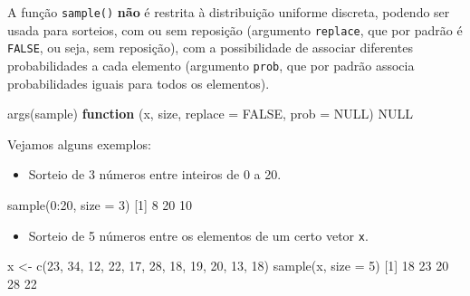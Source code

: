 \documentclass[
  10pt,
  a4paper]{book}
\newenvironment{Shaded}{\begin{snugshade}}{\end{snugshade}}
\newcommand{\AttributeTok}[1]{\textcolor[rgb]{0.77,0.63,0.00}{#1}}
\newcommand{\ConstantTok}[1]{\textcolor[rgb]{0.00,0.00,0.00}{#1}}
\newcommand{\ControlFlowTok}[1]{\textcolor[rgb]{0.13,0.29,0.53}{\textbf{#1}}}
\newcommand{\DecValTok}[1]{\textcolor[rgb]{0.00,0.00,0.81}{#1}}
\newcommand{\FunctionTok}[1]{\textcolor[rgb]{0.00,0.00,0.00}{#1}}
\newcommand{\NormalTok}[1]{#1}
\newcommand{\OtherTok}[1]{\textcolor[rgb]{0.56,0.35,0.01}{#1}}
\newcommand{\SpecialCharTok}[1]{\textcolor[rgb]{0.00,0.00,0.00}{#1}}
\providecommand{\tightlist}{%
  \setlength{\itemsep}{0pt}\setlength{\parskip}{0pt}}
\begin{document}
A função \texttt{sample()} \textbf{não} é restrita à distribuição uniforme discreta,
podendo ser usada para sorteios, com ou sem reposição (argumento
\texttt{replace}, que por padrão é \texttt{FALSE}, ou seja, sem reposição), com a
possibilidade de associar diferentes probabilidades a cada elemento
(argumento \texttt{prob}, que por padrão associa probabilidades iguais para
todos os elementos).

\begin{Shaded}
\begin{Highlighting}[]
\FunctionTok{args}\NormalTok{(sample)}
\ControlFlowTok{function}\NormalTok{ (x, size, }\AttributeTok{replace =} \ConstantTok{FALSE}\NormalTok{, }\AttributeTok{prob =} \ConstantTok{NULL}\NormalTok{) }
\ConstantTok{NULL}
\end{Highlighting}
\end{Shaded}

Vejamos alguns exemplos:

\begin{itemize}
\tightlist
\item
  Sorteio de 3 números entre inteiros de 0 a 20.
\end{itemize}

\begin{Shaded}
\begin{Highlighting}[]
\FunctionTok{sample}\NormalTok{(}\DecValTok{0}\SpecialCharTok{:}\DecValTok{20}\NormalTok{, }\AttributeTok{size =} \DecValTok{3}\NormalTok{)}
\NormalTok{[}\DecValTok{1}\NormalTok{]  }\DecValTok{8} \DecValTok{20} \DecValTok{10}
\end{Highlighting}
\end{Shaded}

\begin{itemize}
\tightlist
\item
  Sorteio de 5 números entre os elementos de um certo vetor \texttt{x}.
\end{itemize}

\begin{Shaded}
\begin{Highlighting}[]
\NormalTok{x }\OtherTok{\textless{}{-}} \FunctionTok{c}\NormalTok{(}\DecValTok{23}\NormalTok{, }\DecValTok{34}\NormalTok{, }\DecValTok{12}\NormalTok{, }\DecValTok{22}\NormalTok{, }\DecValTok{17}\NormalTok{, }\DecValTok{28}\NormalTok{, }\DecValTok{18}\NormalTok{, }\DecValTok{19}\NormalTok{, }\DecValTok{20}\NormalTok{, }\DecValTok{13}\NormalTok{, }\DecValTok{18}\NormalTok{)}
\FunctionTok{sample}\NormalTok{(x, }\AttributeTok{size =} \DecValTok{5}\NormalTok{)}
\NormalTok{[}\DecValTok{1}\NormalTok{] }\DecValTok{18} \DecValTok{23} \DecValTok{20} \DecValTok{28} \DecValTok{22}
\end{Highlighting}
\end{Shaded}
\end{document}
